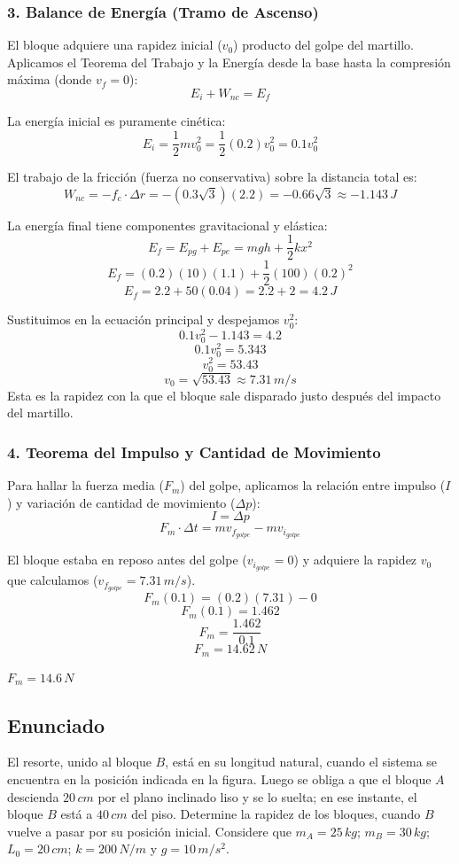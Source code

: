 \documentclass[12pt, a4paper]{article}
\begin{document}
\subsubsection*{3. Balance de Energía (Tramo de Ascenso)}
El bloque adquiere una rapidez inicial ($v_0$) producto del golpe del martillo. Aplicamos el Teorema del Trabajo y la Energía desde la base hasta la compresión máxima (donde $v_f = 0$):
$$ E_i + W_{nc} = E_f $$

La energía inicial es puramente cinética:
$$ E_i = \frac{1}{2} m v_0^2 = \frac{1}{2} (0.2) v_0^2 = 0.1 v_0^2 $$

El trabajo de la fricción (fuerza no conservativa) sobre la distancia total es:
$$ W_{nc} = -f_c \cdot \Delta r = -(0.3 \sqrt{3})(2.2) = -0.66 \sqrt{3} \approx -1.143 \, \si{J} $$

La energía final tiene componentes gravitacional y elástica:
$$ E_f = E_{pg} + E_{pe} = mgh + \frac{1}{2} k x^2 $$
$$ E_f = (0.2)(10)(1.1) + \frac{1}{2} (100)(0.2)^2 $$
$$ E_f = 2.2 + 50(0.04) = 2.2 + 2 = 4.2 \, \si{J} $$

Sustituimos en la ecuación principal y despejamos $v_0^2$:
$$ 0.1 v_0^2 - 1.143 = 4.2 $$
$$ 0.1 v_0^2 = 5.343 $$
$$ v_0^2 = 53.43 $$
$$ v_0 = \sqrt{53.43} \approx 7.31 \, \si{m/s} $$
Esta es la rapidez con la que el bloque sale disparado justo después del impacto del martillo.

\subsubsection*{4. Teorema del Impulso y Cantidad de Movimiento}
Para hallar la fuerza media ($F_m$) del golpe, aplicamos la relación entre impulso ($I$) y variación de cantidad de movimiento ($\Delta p$):
$$ I = \Delta p $$
$$ F_m \cdot \Delta t = m v_f_{golpe} - m v_i_{golpe} $$

El bloque estaba en reposo antes del golpe ($v_i_{golpe} = 0$) y adquiere la rapidez $v_0$ que calculamos ($v_f_{golpe} = 7.31 \, \si{m/s}$).
$$ F_m (0.1) = (0.2)(7.31) - 0 $$
$$ F_m (0.1) = 1.462 $$
$$ F_m = \frac{1.462}{0.1} $$
$$ F_m = 14.62 \, \si{N} $$

\begin{tcolorbox}[colback=green!5!white, colframe=green!50!black, title=Respuesta Final]
\centering \Large $F_m = 14.6 \, \si{N}$
\end{tcolorbox}

\newpage

\subsection*{Enunciado}
El resorte, unido al bloque $B$, está en su longitud natural, cuando el sistema se encuentra en la posición indicada en la figura. Luego se obliga a que el bloque $A$ descienda $20 \, \si{cm}$ por el plano inclinado liso y se lo suelta; en ese instante, el bloque $B$ está a $40 \, \si{cm}$ del piso. Determine la rapidez de los bloques, cuando $B$ vuelve a pasar por su posición inicial. Considere que $m_A = 25 \, \si{kg}$; $m_B = 30 \, \si{kg}$; $L_0 = 20 \, \si{cm}$; $k = 200 \, \si{N/m}$ y $g = 10 \, \si{m/s^2}$.
\end{document}
